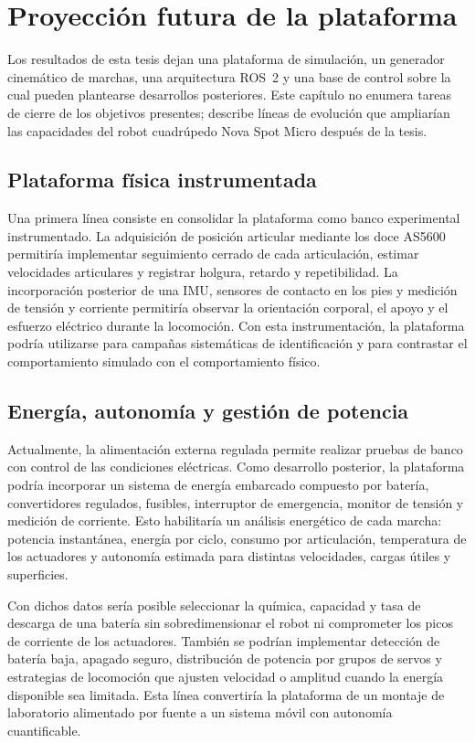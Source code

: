 \chapter{Proyección futura de la plataforma}

Los resultados de esta tesis dejan una plataforma de simulación, un generador
cinemático de marchas, una arquitectura ROS~2 y una base de control sobre la
cual pueden plantearse desarrollos posteriores. Este capítulo no enumera
tareas de cierre de los objetivos presentes; describe líneas de evolución que
ampliarían las capacidades del robot cuadrúpedo Nova Spot Micro después de la
tesis.

\section{Plataforma física instrumentada}

Una primera línea consiste en consolidar la plataforma como banco experimental
instrumentado. La adquisición de posición articular mediante los doce AS5600
permitiría implementar seguimiento cerrado de cada articulación, estimar
velocidades articulares y registrar holgura, retardo y repetibilidad. La
incorporación posterior de una IMU, sensores de contacto en los pies y medición
de tensión y corriente permitiría observar la orientación corporal, el apoyo y
el esfuerzo eléctrico durante la locomoción. Con esta instrumentación, la
plataforma podría utilizarse para campañas sistemáticas de identificación y
para contrastar el comportamiento simulado con el comportamiento físico.

\section{Energía, autonomía y gestión de potencia}

Actualmente, la alimentación externa regulada permite realizar pruebas de banco
con control de las condiciones eléctricas. Como desarrollo posterior, la
plataforma podría incorporar un sistema de energía embarcado compuesto por
batería, convertidores regulados, fusibles, interruptor de emergencia, monitor
de tensión y medición de corriente. Esto habilitaría un análisis energético de
cada marcha: potencia instantánea, energía por ciclo, consumo por articulación,
temperatura de los actuadores y autonomía estimada para distintas velocidades,
cargas útiles y superficies.

Con dichos datos sería posible seleccionar la química, capacidad y tasa de
descarga de una batería sin sobredimensionar el robot ni comprometer los picos
de corriente de los actuadores. También se podrían implementar detección de
batería baja, apagado seguro, distribución de potencia por grupos de servos y
estrategias de locomoción que ajusten velocidad o amplitud cuando la energía
disponible sea limitada. Esta línea convertiría la plataforma de un montaje de
laboratorio alimentado por fuente a un sistema móvil con autonomía cuantificable.

